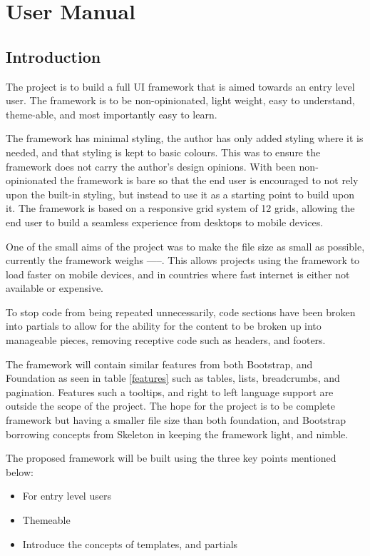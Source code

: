 \newpage
\chapter*{User Manual}
\section*{Introduction}

The project is to build a full \gls{UI} framework that is aimed towards an entry level user. The framework is to be non-opinionated, light weight, easy to understand, theme-able, and most importantly easy to learn.

The framework has minimal styling, the author has only added styling where it is needed, and that styling is kept to basic colours. This was to ensure the framework does not carry the author's design opinions. With been non-opinionated the framework is bare so that the end user is encouraged to not rely upon the built-in styling, but instead to use it as a starting point to build upon it. The framework is based on a responsive grid system of 12 grids, allowing the end user to build a seamless experience from desktops to mobile devices.

One of the small aims of the project was to make the file size as small as possible, currently the framework weighs -----. This allows projects using the framework to load faster on mobile devices, and in countries where fast internet is either not available or expensive. 

To stop code from being repeated unnecessarily, code sections have been broken into partials to allow for the ability for the content to be broken up into manageable pieces, removing receptive code such as headers, and footers.

\newpage
The framework will contain similar features from both Bootstrap, and Foundation as seen in table \ref{features} such as tables, lists, breadcrumbs, and pagination. Features such a tooltips, and right to left language support are outside the scope of the project. The hope for the project is to be complete framework but having a smaller file size than both foundation, and Bootstrap borrowing concepts from Skeleton in keeping the framework light, and nimble. 

The proposed framework will be built using the three key points mentioned below: 
\begin{itemize}
	\item For entry level users
	\item Themeable
	\item Introduce the concepts of templates, and partials
\end{itemize}
